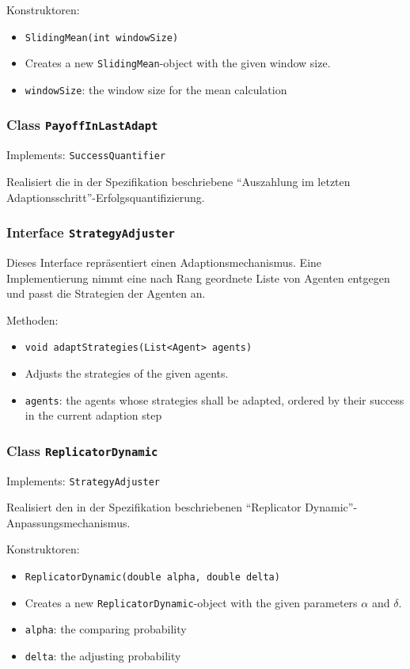 \documentclass[parskip=full,11pt]{scrartcl}
\begin{document}
Konstruktoren:
\begin{itemize}\itemsep -10pt
\item \texttt{SlidingMean(int windowSize)}
\item[] Creates a new \texttt{SlidingMean}-object with the given window size.
\item[] \texttt{windowSize}: the window size for the mean calculation
\end{itemize}

\subsubsection{Class \texttt{PayoffInLastAdapt}}
Implements: \texttt{SuccessQuantifier}

Realisiert die in der Spezifikation beschriebene \enquote{Auszahlung im letzten Adaptionsschritt}-Erfolgsquantifizierung.

\subsubsection{Interface \texttt{StrategyAdjuster}}
Dieses Interface repräsentiert einen Adaptionsmechanismus. Eine Implementierung nimmt eine nach Rang geordnete Liste von Agenten entgegen und passt die Strategien der Agenten an.

Methoden:
\begin{itemize}\itemsep -10pt
\item \texttt{void adaptStrategies(List<Agent> agents)}
\item[] Adjusts the strategies of the given agents.
\item[] \texttt{agents}: the agents whose strategies shall be adapted, ordered by their success in the current adaption step
\end{itemize}

\subsubsection{Class \texttt{ReplicatorDynamic}}
Implements: \texttt{StrategyAdjuster}

Realisiert den in der Spezifikation beschriebenen \enquote{Replicator Dynamic}-Anpassungsmechanismus.

Konstruktoren:
\begin{itemize}\itemsep -10pt
\item \texttt{ReplicatorDynamic(double alpha, double delta)}
\item[] Creates a new \texttt{ReplicatorDynamic}-object with the given parameters \(\alpha\) and \(\delta\).
\item[] \texttt{alpha}: the comparing probability
\item[] \texttt{delta}: the adjusting probability
\end{itemize}
\end{document}
